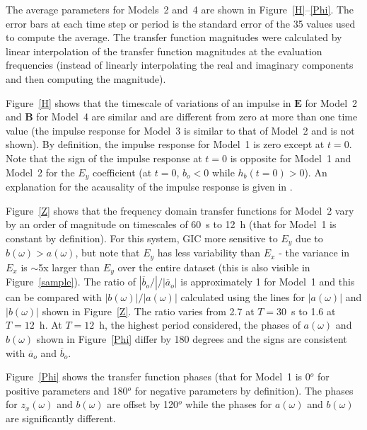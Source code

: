 \documentclass[draft,linenumbers]{agujournal2018}
\begin{document}
The average parameters for Models~2 and~4 are shown in Figure~\ref{H}--\ref{Phi}. The error bars at each time step or period is the standard error of the 35 values used to compute the average. The transfer function magnitudes were calculated by linear interpolation of the transfer function magnitudes at the evaluation frequencies (instead of linearly interpolating the real and imaginary components and then computing the magnitude).

Figure~\ref{H} shows that the timescale of variations of an impulse in $\mathbf{E}$ for Model~2 and $\mathbf{B}$ for Model~4 are similar and are different from zero at more than one time value (the impulse response for Model~3 is similar to that of Model~2 and is not shown). By definition, the impulse response for Model~1 is zero except at $t=0$. Note that the sign of the impulse response at $t=0$ is opposite for Model~1 and Model~2 for the $E_y$ coefficient (at $t=0$, $b_o < 0$ while $h_b(t=0)>0$). An explanation for the acausality of the impulse response is given in \cite{Egbert1992,Kelbert2017}.

Figure~\ref{Z} shows that the frequency domain transfer functions for Model~2 vary by an order of magnitude on timescales of 60~s to 12~h (that for Model~1 is constant by definition). For this system, GIC more sensitive to $E_y$ due to $b(\omega) > a(\omega)$, but note that $E_y$ has less variability than $E_x$ - the variance in $E_x$ is $\sim$5x larger than $E_y$ over the entire dataset (this is also visible in Figure~\ref{sample}). The ratio of $|\overline{b}_o/|/|\overline{a}_o|$ is approximately 1 for Model~1 and this can be compared with $|b(\omega)|/|a(\omega)|$ calculated using the lines for $|a(\omega)|$ and $|b(\omega)|$ shown in Figure~\ref{Z}. The ratio varies from 2.7 at $T=30$~s to 1.6 at $T=12$~h. At $T=12$~h, the highest period considered, the phases of $a(\omega)$ and $b(\omega)$ shown in Figure~\ref{Phi} differ by 180 degrees and the signs are consistent with $\overline{a}_o$ and $\overline{b}_o$. 

Figure~\ref{Phi} shows the transfer function phases (that for Model~1 is 0$^o$ for positive parameters and 180$^o$ for negative parameters by definition). The phases for $z_x(\omega)$ and $b(\omega)$ are offset by 120$^o$ while the phases for $a(\omega)$ and $b(\omega)$ are significantly different.

\end{document}
